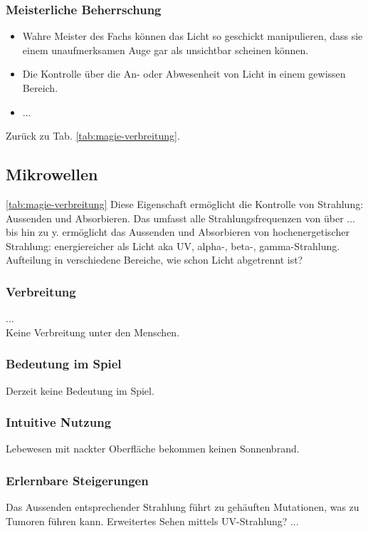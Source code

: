 \subsubsection{Meisterliche Beherrschung} 
\begin{itemize}
	\item Wahre Meister des Fachs können das Licht so geschickt manipulieren, dass sie einem unaufmerksamen Auge gar als unsichtbar scheinen können.
	\item Die Kontrolle über die An- oder Abwesenheit von Licht in einem gewissen Bereich.
	\item ...
\end{itemize}
Zurück zu Tab. \ref{tab:magie-verbreitung}.



\subsection{Mikrowellen}\label{sec:mikrowellenmagie} \ref{tab:magie-verbreitung} %
Diese Eigenschaft ermöglicht die Kontrolle von Strahlung: Aussenden und Absorbieren. Das umfasst alle Strahlungsfrequenzen von  über ... bis hin zu y.
ermöglicht das Aussenden und Absorbieren von hochenergetischer Strahlung: energiereicher als Licht aka UV, alpha-, beta-, gamma-Strahlung. Aufteilung in verschiedene Bereiche, wie schon Licht abgetrennt ist? 

\subsubsection{Verbreitung}
...\\
Keine Verbreitung unter den Menschen.

\subsubsection{Bedeutung im Spiel}
Derzeit keine Bedeutung im Spiel.

\subsubsection{Intuitive Nutzung}
Lebewesen mit nackter Oberfläche bekommen keinen Sonnenbrand.

\subsubsection{Erlernbare Steigerungen}
\begin{outline}
	\1 Das Aussenden entsprechender Strahlung führt zu gehäuften Mutationen, was zu Tumoren führen kann.
	\1 Erweitertes Sehen mittels UV-Strahlung?
	\1 ...
\end{outline}

